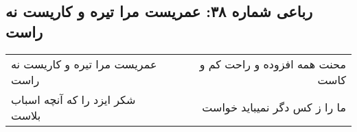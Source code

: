 \begin{center}
\section*{رباعی شماره ۳۸: عمریست مرا تیره و کاریست نه راست}
\label{sec:sh038}
\begin{longtable}{l p{0.5cm} r}
عمریست مرا تیره و کاریست نه راست
&&
محنت همه افزوده و راحت کم و کاست
\\
شکر ایزد را که آنچه اسباب بلاست
&&
ما را ز کس دگر نمیباید خواست
\\
\end{longtable}
\end{center}

